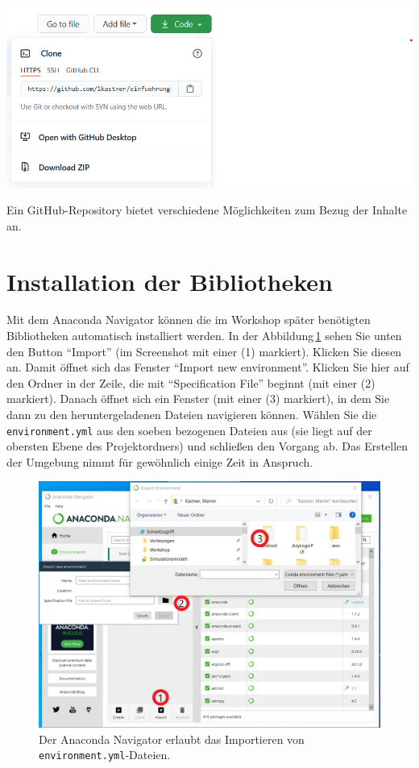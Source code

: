 \documentclass{tufte-handout}
\begin{document}
\begin{marginfigure}
  \includegraphics{github-zip}
  \caption{Ein GitHub-Repository bietet verschiedene Möglichkeiten zum Bezug der Inhalte an.}%
\label{fig:github}
\end{marginfigure}


\section{Installation der Bibliotheken}

Mit dem Anaconda Navigator können die im Workshop später benötigten Bibliotheken automatisch installiert werden.
In der Abbildung\,\ref{fig:anaconda-navigator} sehen Sie unten den Button \enquote{Import} (im Screenshot mit einer (1) markiert).
Klicken Sie diesen an.
Damit öffnet sich das Fenster \enquote{Import new environment}.
Klicken Sie hier auf den Ordner in der Zeile, die mit 
\enquote{Specification File}
beginnt (mit einer (2) markiert).
Danach öffnet sich ein Fenster (mit einer (3) markiert), in dem Sie dann zu den heruntergeladenen Dateien navigieren können.
Wählen Sie die \texttt{environment.yml} aus den soeben bezogenen Dateien aus (sie liegt auf der obersten Ebene des Projektordners) und schließen den Vorgang ab.
Das Erstellen der Umgebung nimmt für gewöhnlich einige Zeit in Anspruch.

\begin{figure}[h]
  \includegraphics{anaconda-navigator-import-new-environment--mit-reihenfolge}
  \caption{Der Anaconda Navigator erlaubt das Importieren von \texttt{environment.yml}-Dateien.}%
\label{fig:anaconda-navigator}
\end{figure}
\end{document}
